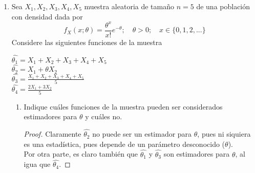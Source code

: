 \documentclass[10pt,a4paper]{article}
\theoremstyle{plain}
\theoremstyle{definition}
\theoremstyle{remark}
\newenvironment{solucion}{\renewcommand{\proofname}{Solución}\renewcommand{\qedsymbol}{}\begin{proof}}{\end{proof}}
\newenvironment{respuesta}{\renewcommand{\proofname}{Respuesta}\renewcommand{\qedsymbol}{}\begin{proof}}{\end{proof}}
\begin{document}
\begin{enumerate}
\begin{solucion}
    \begin{equation*}
    \begin{split}
        \int_{0}^{\infty} \frac{x^2}{2y} e^{-\frac{x}{2y}}dx & = x^{2}e^{-\frac{x}{2y}}\vert_{0}^{\infty} + \int_{0}^{\infty} 2x e^{-\frac{x}{2y}}dx \\
        & = \int_{0}^{\infty} 2x e^{-\frac{x}{2y}}dx \\
        & = -4y\cdot 2y e^{-\frac{x}{2y}}\vert_{0}^{\infty} \\
        & = -8y^{2}e^{-\frac{x}{2y}}\vert_{0}^{\infty} \\
        & = 8y^2
    \end{split}
    \end{equation*}
    Así, tenemos que $E(X^2 | Y) = 8 Y^2$ y por ende, $Var(X|Y) = 8Y^2 - 4Y^2 = 4Y^{2}$
    \end{solucion}
    
    \item Sea $X_1 , X_2 , X_3 , X_4 , X_5$ muestra aleatoria de tamaño $n=5$ de una población con densidad dada por
    \begin{equation*}
        f_{X}(x;\theta) = \frac{\theta^{x}}{x!} e^{-\theta}; \quad \theta > 0; \quad x\in\{0,1,2,...\}
    \end{equation*}
    Considere las siguientes funciones de la muestra
    \begin{center}
        $\hat{\theta_1} = X_1 + X_2 + X_3 + X_4 + X_5$\\
        $\hat{\theta_2} = X_1 + \theta X_2$\\
        $\hat{\theta_3} = \frac{X_1 + X_2 + X_3 + X_4 + X_5}{5}$\\
        $\hat{\theta_4} = \frac{2X_1 + 3X_2}{5}$
    \end{center}
    \begin{enumerate}
        \item Indique cuáles funciones de la muestra pueden ser considerados estimadores para $\theta$ y cuáles no.
        \begin{respuesta}
        Claramente $\hat{\theta_2}$ no puede ser un estimador para $\theta$, pues ni siquiera es una estadística, pues depende de un parámetro desconocido ($\theta$).\\
        Por otra parte, es claro también que $\hat{\theta_1}$ y $\hat{\theta_3}$ son estimadores para $\theta$, al igua que $\hat{\theta_4}$.
        \end{respuesta}
        

\end{enumerate}
\end{enumerate}
\end{document}
